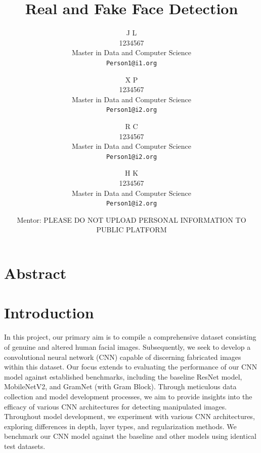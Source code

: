 \documentclass[final]{cvpr}
\begin{document}
\title{Real and Fake Face Detection}  %

\author{J L\\
1234567\\
Master in Data and Computer Science\\
{\tt\small Person1@i1.org}
\and
X P\\
1234567\\
Master in Data and Computer Science\\
{\tt\small Person1@i2.org}
\and
R C\\
1234567\\
Master in Data and Computer Science\\
{\tt\small Person1@i2.org}
\and
H K \\
1234567\\
Master in Data and Computer Science\\
{\tt\small Person1@i2.org}
\and
Mentor: PLEASE DO NOT UPLOAD PERSONAL INFORMATION TO PUBLIC PLATFORM
}


\maketitle
\thispagestyle{empty}


\section{Abstract}

\section{Introduction}

In this project, our primary aim is to compile a comprehensive dataset consisting of genuine and altered human facial images. Subsequently, we seek to develop a convolutional neural network (CNN) capable of discerning fabricated images within this dataset. Our focus extends to evaluating the performance of our CNN model against established benchmarks, including the baseline ResNet model, MobileNetV2, and GramNet (with Gram Block). Through meticulous data collection and model development processes, we aim to provide insights into the efficacy of various CNN architectures for detecting manipulated images. Throughout model development, we experiment with various CNN architectures, exploring differences in depth, layer types, and regularization methods. We benchmark our CNN model against the baseline and other models using identical test datasets.
\end{document}
